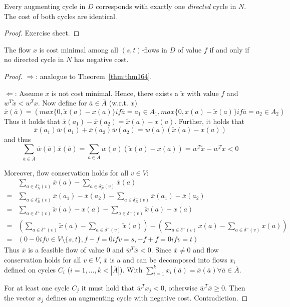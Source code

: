 \begin{lem}
Every augmenting cycle in $D$ corresponds with exactly one \emph{directed}
cycle in $N$. The cost of both cycles are identical.
\end{lem}
\begin{proof}
Exercise sheet.
\end{proof}

\begin{thm}
The flow $x$ is cost minimal among all $(s,t)$-flows in $D$ of value $f$ if
and only if no directed cycle in $N$ has negative cost.
\end{thm}
\begin{proof}
$\Rightarrow$: analogue to Theorem~\ref{thm:thm164}.

$\Leftarrow$: Assume $x$ is not cost minimal. Hence, there exists a
$\tilde{x}$ with value $f$ and $w^T\tilde{x} < w^Tx$.
Now define for $\overline{a} \in \overline{A}$ (w.r.t. $x$)
\[
	\overline{x}(\overline{a}) = ( max \{ 0, \tilde{x}(a) - x(a) \} if
	\overline{a} = a_1 \in A_1, max \{0, x(a) - \tilde{x}(a)\} if
	\overline{a} = a_2 \in A_2 )
\]
Thus it holds that $\overline{x}(a_1) - \overline{x}(a_2) = \tilde{x}(a) -
x(a)$. Further, it holds that 
\[
	\overline{x}(a_1) \overline{w}(a_1) + \overline{x}(a_2) \overline{w}(a_2)
	= w(a) ( \tilde{x}(a) - x(a) )
\]
and thus
\[
	\sum_{\overline{a} \in \overline{A}} \overline{w}(\overline{a})
	\overline{x}(\overline{a}) = 
	\sum_{a \in A} w(a) ( \tilde{x}(a) - x(a) ) = w^T \tilde{x} - w^Tx < 0
\]

Moreover, flow conservation holds for all $v \in V$:
\begin{align*}
	&\sum_{a \in \delta^+_N(v)} \overline{x}(a) - \sum_{a \in \delta^-_N(v)}
	\overline{x}(a) \\
	= &\sum_{a \in \delta^+_D(v)} \overline{x}(a_1) -
	\overline{x}(a_2) - \sum_{a \in \delta^-_D(v)} \overline{x}(a_1) -
	\overline{x}(a_2) \\
	= &\sum_{a \in \delta^+(v)} \tilde{x}(a) - x(a) - \sum_{a \in
	\delta^-(v)} \tilde{x}(a) - x(a) \\
	= &\left( \sum_{a \in \delta^+(v)} \tilde{x}(a) - \sum_{a \in
	\delta^-(v)} \tilde{x}(a) \right) - 
	\left( \sum_{a \in \delta^+(v)} x(a) - \sum_{a \in
	\delta^-(v)} x(a) \right) \\
	= &( 0 - 0 if v \in V \setminus \{s,t\},
	f - f = 0 if v = s,
	-f + f = 0 if v = t )
\end{align*}
Thus $\overline{x}$ is a feasible flow of value $0$ and
$\overline{w}^T\overline{x} < 0$.
Since $\overline{x} \neq 0$ and flow conservation holds for all $v \in V$,
$\overline{x}$ is a  and can be decomposed
into flows $x_i$ defined on cycles $C_i$ ($i = 1, ..., k < |\overline{A}|$).
With $\sum_{i=1}^k x_i(\overline{a}) = \overline{x}(\overline{a}) \forall
\overline{a} \in \overline{A}$.

For at least one cycle $C_j$ it must hold that $\overline{w}^T x_j < 0$,
otherwise $\overline{w}^T \overline{x} \geq 0$. Then the vector $x_j$
defines an augmenting cycle with negative cost.
Contradiction.
\end{proof}

